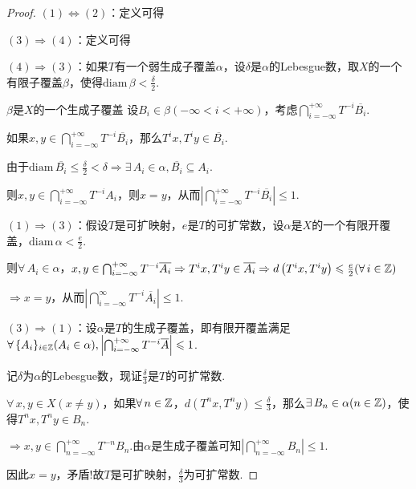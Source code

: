 \begin{proof}
    $(1)\Leftrightarrow (2)$：定义可得 \par
    $(3)\Rightarrow (4)$：定义可得 \par
    $(4)\Rightarrow (3)$：如果$T$有一个弱生成子覆盖$\alpha$，设$\delta$是$\alpha$的Lebesgue数，取$X$的一个有限子覆盖$\beta$，使得$\mathrm{diam}\,\beta<\frac{\delta}{2}$.\par
    \begin{claim}{$\beta$是$X$的一个生成子覆盖}
        设$B_i\in\beta(-\infty<i<+\infty)$，考虑$\bigcap_{i=-\infty}^{+\infty}{T^{-i}\overline{B_i}}$.\par
        如果$x,y\in\bigcap_{i=-\infty}^{+\infty}T^{-i}\overline{B_i}$，那么$T^ix,T^iy\in\overline{B_i}$.\par
        由于$\mathrm{diam}\,\overline{B_i}\leq\frac{\delta}{2}<\delta\Rightarrow \exists\, A_i\in\alpha,\overline{B_i}\subseteq A_i$.\par
        则$x,y\in\bigcap_{i=-\infty}^{+\infty}{T^{-i}A_i}$，则$x=y$，从而$\left|\bigcap_{i=-\infty}^{+\infty}{T^{-i}\overline{B_i}}\right|\leq 1$.
    \end{claim}\par
    $(1)\Rightarrow (3)$：假设$T$是可扩映射，$e$是$T$的可扩常数，设$\alpha$是$X$的一个有限开覆盖，$\mathrm{diam}\,\alpha<\frac{e}{2}$.\par
    则$\forall\, A_i\in\alpha$，$x,y\in\bigcap_{i=-\infty}^{+\infty}{T^{-i}\overline{A_i}}\Rightarrow T^ix,T^iy\in\overline{A_i}\Rightarrow d\left(T^ix,T^iy\right)\leqslant\frac{e}{2}(\forall\, i\in\mathbb{Z})$\par
    $\Rightarrow x=y$，从而$\left|\bigcap_{i=-\infty}^\infty{T^{-i}\overline{A_i}}\right|\leq 1$.\par
    $(3)\Rightarrow (1)$：设$\alpha$是$T$的生成子覆盖，即有限开覆盖满足$\forall\,\{A_i\}_{i\in\mathbb{Z}}(A_i\in\alpha),\left|\bigcap_{i=-\infty}^{+\infty}{T^{-i}}\overline{A}\right|\leqslant 1$.\par
    记$\delta$为$\alpha$的Lebesgue数，现证$\frac{\delta}{3}$是$T$的可扩常数.\par
    $\forall\,x,y\in X(x\neq y)$，如果$\forall\, n\in\mathbb{Z}$，$d\left(T^nx,T^ny\right)\leq\frac{\delta}{3}$，那么$\exists\, B_n\in\alpha(n\in\mathbb{Z})$，使得$T^nx,T^ny\in B_n$.\par
    $\Rightarrow x,y\in\bigcap_{n=-\infty}^{+\infty}{T^{-n}B_n}$.由$\alpha$是生成子覆盖可知$\left|\bigcap_{n=-\infty}^{+\infty}B_n\right|\leq 1$.\par
    因此$x=y$，矛盾!故$T$是可扩映射，$\frac{\delta}{3}$为可扩常数.
\end{proof}

